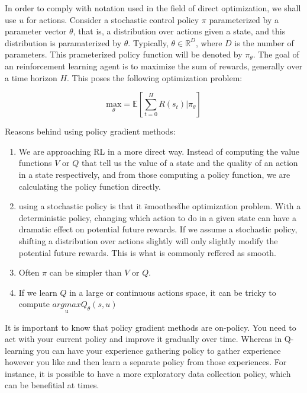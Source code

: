 \documentclass{../main.tex}{subfiles}
\begin{document}
In order to comply with notation used in the field of direct optimization, we shall use $u$ for actions. Consider a stochastic control policy  $\pi$ parameterized by a parameter vector $\theta$, that is, a distribution over actions given a state, and this distribution is paramaterized by $\theta$. Typically, $\theta \in \mathbb{R}^{D}$, where $D$ is the number of parameters. This prameterized policy function will be denoted by $\pi_{\theta}$. The goal of an reinforcement learning agent is to maximize the sum of rewards, generally over a time horizon $H$. This poses the following optimization problem:

\begin{equation}\label{equation:expected-reward-theta}
\underset{\theta}{\text{max}} = \mathbb{E}[\sum^{H}_{t=0} R(s_t) | \pi_{\theta}]
\end{equation}



Reasons behind using policy gradient methods:
\begin{enumerate}
\item We are approaching RL in a more direct way. Instead of computing the value functions $V$ or $Q$ that tell us the value of a state and the quality of an action in a state respectively, and from those computing a policy function, we are calculating the policy function directly.
\item using a stochastic policy is that it \"smoothes\" the optimization problem. With a deterministic policy, changing which action to do in a given state can have a dramatic effect on potential future rewards. If we assume a stochastic policy, shifting a distribution over actions slightly will only slightly modify the potential future rewards. This is what is commonly reffered as smooth.
\item Often $\pi$ can be simpler than $V$ or $Q$.
\item If we learn $Q$ in a large or continuous actions space, it can be tricky to compute $\underset{\text{u}}{argmax}Q_{\theta}(s,u)$
\end{enumerate}
 
It is important to know that policy gradient methods are on-policy. You need  to act with your current policy and improve it gradually over time. Whereas in Q-learning you can have your experience gathering policy to gather experience however you like and then learn a separate policy from those experiences. For instance, it is possible to have a more exploratory data collection policy, which can be benefitial at times.
\end{document}
